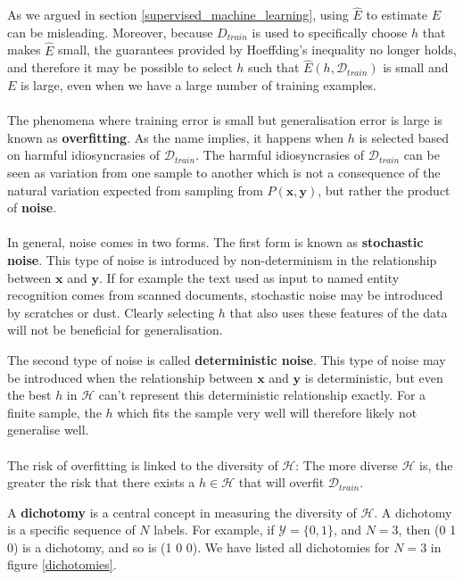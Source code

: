 As we argued in section \ref{supervised_machine_learning}, using $\hat{E}$ to estimate $E$ can be misleading. Moreover, because $D_{train}$ is used to specifically choose $h$ that makes $\hat{E}$ small, the guarantees provided by Hoeffding's inequality no longer holds, and therefore it may be possible to select $h$ such that $\hat{E}(h, \mathcal{D}_{train})$ is small and $E$ is large, even when we have a large number of training examples.
\\\\
The phenomena where training error is small but generalisation error is large is known as \textbf{overfitting}. As the name implies, it happens when $h$ is selected based on harmful idiosyncrasies of $\mathcal{D}_{train}$. The harmful idiosyncrasies of $\mathcal{D}_{train}$ can be seen as variation from one sample to another which is not a consequence of the natural variation expected from sampling from $P(\mathbf{x}, \mathbf{y})$, but rather the product of \textbf{noise}.
\\\\
In general, noise comes in two forms. The first form is known as \textbf{stochastic noise}. This type of noise is introduced by non-determinism in the relationship between $\mathbf{x}$ and $\mathbf{y}$. If for example the text used as input to named entity recognition comes from scanned documents, stochastic noise may be introduced by scratches or dust. Clearly selecting $h$ that also uses these features of the data will not be beneficial for generalisation.

The second type of noise is called \textbf{deterministic noise}. This type of noise may be introduced when the relationship between $\mathbf{x}$ and $\mathbf{y}$ is deterministic, but even the best $h$ in $\mathcal{H}$ can't represent this deterministic relationship exactly. For a finite sample, the $h$ which fits the sample very well will therefore likely not generalise well.
\\\\
The risk of overfitting is linked to the diversity of $\mathcal{H}$: The more diverse $\mathcal{H}$ is, the greater the risk that there exists a $h \in \mathcal{H}$ that will overfit $\mathcal{D}_{train}$.

A \textbf{dichotomy} is a central concept in measuring the diversity of $\mathcal{H}$. A dichotomy is a specific sequence of $N$ labels. For example, if $\mathcal{Y} = \{0, 1\}$, and $N = 3$, then (0 1 0) is a dichotomy, and so is (1 0 0). We have listed all dichotomies for $N = 3$ in figure \ref{dichotomies}.

